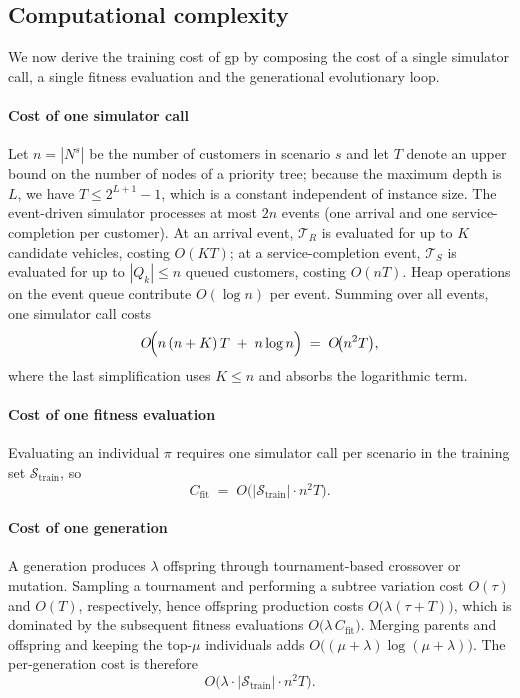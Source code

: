 \documentclass[pdflatex]{sn-jnl}
\begin{document}
\subsection{Computational complexity} \label{subsec:complexity-method}

We now derive the training cost of \gls{gp} by composing the cost of a
single simulator call, a single fitness evaluation and the
generational evolutionary loop.

\paragraph{Cost of one simulator call}
Let $n=|N^s|$ be the number of customers in scenario $s$ and let $T$
denote an upper bound on the number of nodes of a priority tree;
because the maximum depth is $L$, we have $T\le 2^{L+1}-1$, which is a
constant independent of instance size. The event-driven simulator
processes at most $2n$ events (one arrival and one service-completion
per customer). At an arrival event, $\mathcal{T}_R$ is evaluated for
up to $K$ candidate vehicles, costing $O(KT)$; at a
service-completion event, $\mathcal{T}_S$ is evaluated for up to
$|Q_k|\le n$ queued customers, costing $O(nT)$. Heap operations on
the event queue contribute $O(\log n)$ per event. Summing over all
events, one simulator call costs
\begin{equation}
\label{eq:cost-sim}
O\!\Bigl(n\,(n+K)\,T \;+\; n\log n\Bigr)
\;=\;
O\!\bigl(n^2 T\bigr),
\end{equation}
where the last simplification uses $K\le n$ and absorbs the logarithmic
term.

\paragraph{Cost of one fitness evaluation}
Evaluating an individual $\pi$ requires one simulator call per
scenario in the training set $\mathcal{S}_{\text{train}}$, so
\begin{equation}
\label{eq:cost-fit}
C_{\mathrm{fit}}
\;=\;
O\!\bigl(|\mathcal{S}_{\text{train}}|\cdot n^2 T\bigr).
\end{equation}

\paragraph{Cost of one generation}
A generation produces $\lambda$ offspring through
tournament-based crossover or mutation. Sampling a tournament and
performing a subtree variation cost $O(\tau)$ and $O(T)$,
respectively, hence offspring production costs
$O\!\bigl(\lambda(\tau+T)\bigr)$, which is dominated by the
subsequent fitness evaluations
$O\!\bigl(\lambda\,C_{\mathrm{fit}}\bigr)$. Merging parents
and offspring and keeping the top-$\mu$ individuals adds
$O\!\bigl((\mu+\lambda)\log(\mu+\lambda)\bigr)$. The
per-generation cost is therefore
\begin{equation}
\label{eq:cost-gen}
O\!\bigl(\lambda\cdot|\mathcal{S}_{\text{train}}|\cdot n^2 T\bigr).
\end{equation}
\end{document}

